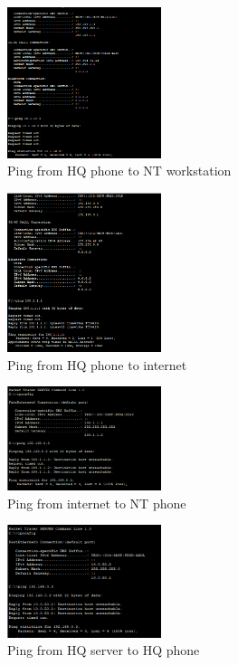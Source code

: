 \begin{figure}[H]
  \centering
  \includegraphics[width=0.4\textwidth]{./assets/ping.hqp-ntw.png}
  \caption{Ping from HQ phone to NT workstation}
\end{figure}

\begin{figure}[H]
  \centering
  \includegraphics[width=0.4\textwidth]{./assets/ping.hqp-web.png}
  \caption{Ping from HQ phone to internet}
\end{figure}

\begin{figure}[H]
  \centering
  \includegraphics[width=0.4\textwidth]{./assets/ping.web-p.png}
  \caption{Ping from internet to NT phone}
\end{figure}

\begin{figure}[H]
  \centering
  \includegraphics[width=0.4\textwidth]{./assets/ping.hqs-hqp.png}
  \caption{Ping from HQ server to HQ phone}
\end{figure}

